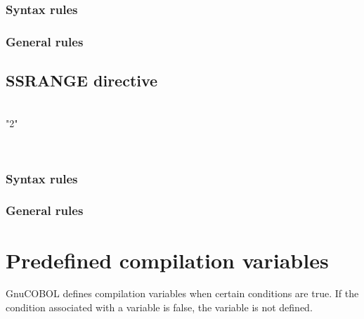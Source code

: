 \subsubsection{Syntax rules}

\subsubsection{General rules}

\subsection{SSRANGE directive}

\begin{syntax}[\miscextcolour]
  \begin{0-1}
     \\
    "2" \\
  \end{0-1}
\end{syntax}

\begin{syntax}[\miscextcolour]
  \begin{1=}
     \\
  \end{1=}
\end{syntax}

\subsubsection{Syntax rules}

\subsubsection{General rules}

\section{Predefined compilation variables}

GnuCOBOL defines compilation variables when certain conditions are true. If the condition associated with a variable is false, the variable is not defined.

